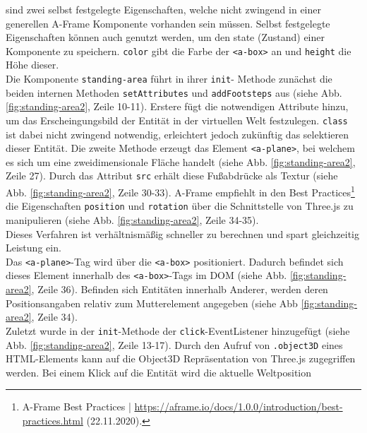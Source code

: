 \documentclass[a4paper,12pt,oneside]{article}
\begin{document}
        sind zwei selbst festgelegte
        Eigenschaften, welche nicht zwingend in einer generellen
        A-Frame Komponente
        vorhanden sein müssen. Selbst festgelegte Eigenschaften können
        auch genutzt werden, um den state (Zustand) einer Komponente
        zu speichern. \texttt{color} gibt die Farbe der \texttt{<a-box>}
        an und \texttt{height} die Höhe dieser. \\
        Die Komponente \texttt{standing-area} führt in ihrer \texttt{init}-
        Methode zunächst die beiden internen Methoden \texttt{setAttributes}
        und \texttt{addFootsteps} aus (siehe Abb. \ref{fig:standing-area2}, Zeile 10-11).
        Erstere fügt die notwendigen
        Attribute hinzu, um das Erscheingungsbild der Entität in der
        virtuellen Welt festzulegen. \texttt{class} ist dabei nicht
        zwingend notwendig, erleichtert jedoch zukünftig das selektieren
        dieser Entität. Die zweite Methode erzeugt das Element 
        \texttt{<a-plane>}, bei welchem es sich um eine zweidimensionale
        Fläche handelt
        (siehe Abb. \ref{fig:standing-area2}, Zeile 27). 
        Durch das Attribut \texttt{src} erhält diese Fußabdrücke
        als Textur (siehe Abb. \ref{fig:standing-area2}, Zeile 30-33).
        A-Frame empfiehlt in den Best Practices\footnote{A-Frame Best Practices | \url{https://aframe.io/docs/1.0.0/introduction/best-practices.html} (22.11.2020).}
        die Eigenschaften
        \texttt{position} und \texttt{rotation} über die Schnittstelle
        von Three.js zu manipulieren (siehe Abb. \ref{fig:standing-area2}, Zeile 34-35). \\
        Dieses Verfahren ist verhältnismäßig schneller zu berechnen 
        und spart gleichzeitig Leistung ein. \\
        Das \texttt{<a-plane>}-Tag wird über die \texttt{<a-box>}
        positioniert. Dadurch befindet sich dieses Element 
        innerhalb des \texttt{<a-box>}-Tags im DOM (siehe Abb. \ref{fig:standing-area2}, Zeile 36).
        Befinden sich Entitäten innerhalb Anderer,
        werden deren Positionsangaben relativ zum Mutterelement angegeben
        (siehe Abb \ref{fig:standing-area2}, Zeile 34). \\
        Zuletzt wurde in der \texttt{init}-Methode der \texttt{click}-EventListener
        hinzugefügt (siehe Abb. \ref{fig:standing-area2}, Zeile 13-17).
        Durch den Aufruf von \texttt{.object3D} eines HTML-Elements kann
        auf die Object3D Repräsentation von Three.js zugegriffen werden.
        Bei einem Klick auf die Entität wird die aktuelle Weltposition
\end{document}
